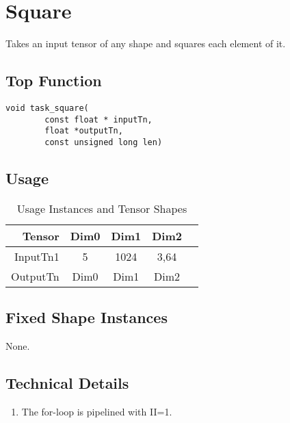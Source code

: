 \section{Square}
Takes an input tensor of any shape and squares each element of it.

\subsection{Top Function}
\begin{lstlisting}
void task_square(
		const float * inputTn,
		float *outputTn,
		const unsigned long len)
\end{lstlisting}

\subsection{Usage}
\begin{table}[htbp] %
\caption{Usage Instances and Tensor Shapes}
\label{tab:shapes_concat}
	\begin{center}
		\begin{tabular}{|r|c|c|c|c|} 
		\hline	
		Tensor & Dim0 & Dim1 & Dim2\\ 
		\hline	
		InputTn1 &
			5 &
			1024 &
			3,64\\ 
		\hline
		OutputTn &
			Dim0 & 
			Dim1 & 
			Dim2 \\
		\hline
		\end{tabular}
	\end{center}
\end{table}

\subsection{Fixed Shape Instances}
None.

\subsection{Technical Details}
\begin{enumerate}
\item The for-loop is pipelined with II=1.
\end{enumerate}










\pagebreak














